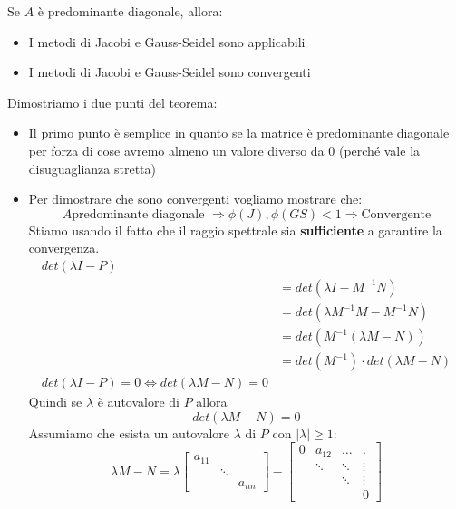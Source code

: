 \begin{theorem}
	Se $A$ è predominante diagonale, allora:
	\begin{itemize}
		\item I metodi di Jacobi e Gauss-Seidel sono applicabili
		\item I metodi di Jacobi e Gauss-Seidel sono convergenti
	\end{itemize}
\end{theorem}
\begin{demostration}
	Dimostriamo i due punti del teorema:
	\begin{itemize}
		\item Il primo punto è semplice in quanto se la matrice è predominante diagonale per forza di cose avremo almeno un valore diverso da $0$ (perché vale la disuguaglianza stretta)
		\item Per dimostrare che sono convergenti vogliamo mostrare che:
		\begin{equation*}
			A \text{predominante diagonale }\Rightarrow \phi(J), \phi(GS) <1 \Rightarrow \text{Convergente} 
		\end{equation*}
		Stiamo usando il fatto che il raggio spettrale sia \textbf{sufficiente} a garantire la convergenza.
		\begin{equation*}
			\begin{split}
				det(\lambda I-P)\\ &= det(\lambda I - M^{-1}N) \\&=det(\lambda M^{-1}M - M^{-1}N)\\ & =det(M^{-1}(\lambda M -N)) \\&=det(M^{-1}) \cdot det(\lambda M - N) \\
				det(\lambda I -P ) = 0 \Leftrightarrow det(\lambda M - N) = 0
			\end{split}
		\end{equation*}
		Quindi se $\lambda$ è autovalore di $P$ allora
		\begin{equation}
			\label{equation:absurd_dem_jacobi}
			det(\lambda M -N)=0
		\end{equation}
		Assumiamo che esista un autovalore $\lambda$ di $P$ con $\lvert \lambda \rvert \geq 1$:
		\begin{equation*}
			\lambda M - N = \lambda \begin{bmatrix}
				a_{11}\\
				& \ddots \\
				& & a_{nn}
			\end{bmatrix} - \begin{bmatrix}
			0 & a_{12} & \ldots & . \\
			& \ddots & \ddots & \vdots \\
			& & \ddots & \vdots \\
			& & & 0
			

\end{bmatrix}
\end{equation*}
\end{itemize}
\end{demostration}

